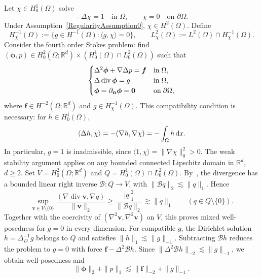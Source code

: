 \documentclass[10pt]{amsart}
\newcommand{\dx}{\,{\rm d}x}
\renewcommand{\div}{\operatorname{div}}
\numberwithin{equation}{section}
\begin{document}
Let $\chi\in H_0^1(\Omega)$ solve
\[
-\Delta\chi=1\quad\text{in }\Omega,\qquad \chi=0\quad\text{on }\partial\Omega.
\]
Under Assumption~\ref{RegularityAssumption0}, $\chi\in H^2(\Omega)$. Define
\[
H^{-1}_\chi(\Omega):=\{g\in H^{-1}(\Omega):\langle g,\chi\rangle=0\},
\qquad L^2_\chi(\Omega):=L^2(\Omega)\cap H^{-1}_\chi(\Omega).
\]
Consider the fourth order Stokes problem: find $(\boldsymbol\phi,p)\in H_0^2(\Omega;\mathbb R^d)\times(H_0^1(\Omega)\cap L_0^2(\Omega))$ such that
\begin{equation}\label{eq:fourthorderStokes}
\begin{cases}
\Delta^2\boldsymbol\phi+\nabla\Delta p=\boldsymbol f & {\rm in }\;\Omega,\\
\Delta\div\boldsymbol\phi=g & {\rm in }\;\Omega,\\
\boldsymbol\phi=\partial_{\boldsymbol n}\boldsymbol\phi=\boldsymbol0 & {\rm on }\;\partial\Omega,
\end{cases}
\end{equation}
where $\boldsymbol f\in H^{-2}(\Omega;\mathbb R^d)$ and $g\in H^{-1}_\chi(\Omega)$.
This compatibility condition is necessary: for $h\in H_0^1(\Omega)$,
\[
\langle\Delta h,\chi\rangle=-(\nabla h,\nabla\chi)=-\int_\Omega h\dx.
\]
In particular, $g=1$ is inadmissible, since $\langle1,\chi\rangle=\|\nabla\chi\|_0^2>0$.
The weak stability argument applies on any bounded connected Lipschitz domain in $\mathbb R^d$, $d\geq2$. Set $V=H_0^2(\Omega;\mathbb R^d)$ and $Q=H_0^1(\Omega)\cap L_0^2(\Omega)$. By~\cite[Theorem~1.1 and Corollary~4.7(b)]{CostabelMcIntosh2010}, the divergence has a bounded linear right inverse $\mathcal B:Q\to V$, with $\|\mathcal Bq\|_2\lesssim\|q\|_1$. Hence
\[
\sup_{\boldsymbol v\in V\setminus\{0\}}
\frac{(\nabla\div\boldsymbol v,\nabla q)}{\|\boldsymbol v\|_2}
\geq\frac{|q|_1^2}{\|\mathcal Bq\|_2}\gtrsim\|q\|_1
\qquad(q\in Q\setminus\{0\}).
\]
Together with the coercivity of $(\nabla^2\boldsymbol v,\nabla^2\boldsymbol v)$ on $V$, this proves mixed well-posedness for $g=0$ in every dimension. For compatible $g$, the Dirichlet solution $h=\Delta_D^{-1}g$ belongs to $Q$ and satisfies $\|h\|_1\lesssim\|g\|_{-1}$. Subtracting $\mathcal Bh$ reduces the problem to $g=0$ with force $\boldsymbol f-\Delta^2\mathcal Bh$. Since $\|\Delta^2\mathcal Bh\|_{-2}\lesssim\|g\|_{-1}$, we obtain well-posedness and
\begin{equation}\label{eq:fourthorderStokesregularity0}
\|\boldsymbol\phi\|_2+\|p\|_1\lesssim\|\boldsymbol f\|_{-2}+\|g\|_{-1}.
\end{equation}
\end{document}
